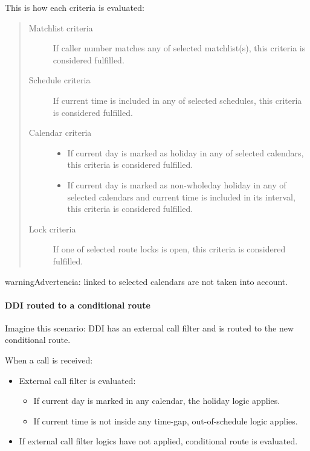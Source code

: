 \documentclass[letterpaper,10pt,spanish]{sphinxmanual}
\begin{document}
This is how each criteria is evaluated:
\begin{quote}
\begin{description}
\item[{Matchlist criteria}] \leavevmode
If caller number matches any of selected matchlist(s), this criteria is considered fulfilled.

\item[{Schedule criteria}] \leavevmode
If current time is included in any of selected schedules, this criteria is considered fulfilled.

\item[{Calendar criteria}] \leavevmode\begin{itemize}
\item {} 
If current day is marked as holiday in any of selected calendars, this criteria is considered fulfilled.

\item {} 
If current day is marked as non-wholeday holiday in any of selected calendars and current time is included
in its interval, this criteria is considered fulfilled.

\end{itemize}

\item[{Lock criteria}] \leavevmode
If one of selected route locks is open, this criteria is considered fulfilled.

\end{description}
\end{quote}

\begin{notice}{warning}{Advertencia:}
{\hyperref[administration_portal/client/vpbx/routing_tools/calendars:special\string-schedules]{}} linked to selected calendars are not taken into account.
\end{notice}


\paragraph{DDI routed to a conditional route}
\label{administration_portal/client/vpbx/routing_endpoints/conditional_routes:ddi-routed-to-a-conditional-route}
Imagine this scenario: DDI has an external call filter and is routed to the new conditional route.

When a call is received:
\begin{itemize}
\item {} 
External call filter is evaluated:
\begin{itemize}
\item {} 
If current day is marked in any calendar, the holiday logic applies.

\item {} 
If current time is not inside any time-gap, out-of-schedule logic applies.

\end{itemize}

\item {} 
If external call filter logics have not applied, conditional route is evaluated.

\end{itemize}
\end{document}
